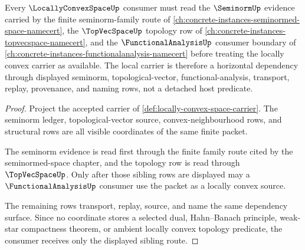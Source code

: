 \begin{theorem}
\label{thm:locally-convex-space-sibling-route}
Every $\LocallyConvexSpaceUp$ consumer must read the $\SeminormUp$ evidence carried by the finite seminorm-family route of \autoref{ch:concrete-instances-seminormed-space-namecert}, the $\TopVecSpaceUp$ topology row of \autoref{ch:concrete-instances-topvecspace-namecert}, and the $\FunctionalAnalysisUp$ consumer boundary of \autoref{ch:concrete-instances-functionalanalysis-namecert} before treating the locally convex carrier as available. The local carrier is therefore a horizontal dependency through displayed seminorm, topological-vector, functional-analysis, transport, replay, provenance, and naming rows, not a detached host predicate.
\end{theorem}
\begin{proof}
Project the accepted carrier of \autoref{def:locally-convex-space-carrier}. The seminorm ledger, topological-vector source, convex-neighbourhood rows, and structural rows are all visible coordinates of the same finite packet.

The seminorm evidence is read first through the finite family route cited by the seminormed-space chapter, and the topology row is read through $\TopVecSpaceUp$. Only after those sibling rows are displayed may a $\FunctionalAnalysisUp$ consumer use the packet as a locally convex source.

The remaining rows transport, replay, source, and name the same dependency surface. Since no coordinate stores a selected dual, Hahn--Banach principle, weak-star compactness theorem, or ambient locally convex topology predicate, the consumer receives only the displayed sibling route.
\end{proof}
